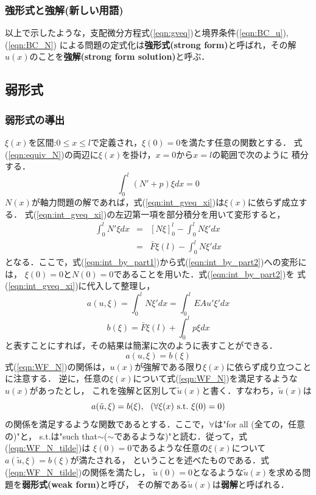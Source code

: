 \documentclass[10pt,a4j]{jarticle}
\begin{document}
\subsubsection{強形式と強解(新しい用語)}
以上で示したような，支配微分方程式(\ref{eqn:gveq})と境界条件(\ref{eqn:BC_u}),(\ref{eqn:BC_N})
による問題の定式化は{\bf 強形式(strong form)}と呼ばれ，その解$u(x)$のことを{\bf 強解(strong form solution)}と呼ぶ．
\subsection{弱形式}
\subsubsection{弱形式の導出}
$\xi (x)$を区間:$0\leq x \leq l$で定義され，$\xi(0)=0$を満たす任意の関数とする．
式(\ref{eqn:equiv_N})の両辺に$\xi (x)$を掛け，$x=0$から$x=l$の範囲で次のように
積分する．
\begin{equation}
	\int _0^l 
	\left(N'+p \right) \xi dx =0
	\label{eqn:int_gveq_xi}
\end{equation}
$N(x)$が軸力問題の解であれば，式(\ref{eqn:int_gveq_xi})は$\xi(x)$に依らず成立する．
式(\ref{eqn:int_gveq_xi})の左辺第一項を部分積分を用いて変形すると，
\begin{eqnarray}
	\int _0^l N'\xi dx &= & \left[ N\xi \right]_0^l -\int_0^l N \xi'dx  
	\label{eqn:int_by_part1}
	\\
	&= & \bar F \xi(l)  -\int_0^l N \xi'dx  
	\label{eqn:int_by_part2}
\end{eqnarray}
となる．ここで，式(\ref{eqn:int_by_part1})から式(\ref{eqn:int_by_part2})への変形には，
$\xi(0)=0$と$N(0)=0$であることを用いた．式(\ref{eqn:int_by_part2})を
式(\ref{eqn:int_gveq_xi})に代入して整理し，
\begin{equation}
	a(u,\xi) = \int_0^l N \xi'dx  
	= \int_0^l EA u' \xi'dx  
	\label{eqn:blinf_N}
\end{equation}
\begin{equation}
	b(\xi)= \bar F \xi (l) + 
	\int_0^l p\xi dx 
	\label{eqn:linf_N}
\end{equation}
と表すことにすれば，その結果は簡潔に次のように表すことができる．
\begin{equation}
	a(u,\xi)=b(\xi)
	\label{eqn:WF_N}
\end{equation}
式(\ref{eqn:WF_N})の関係は，$u(x)$が強解である限り$\xi(x)$に依らず成り立つことに注意する．
逆に，任意の$\xi(x)$について式(\ref{eqn:WF_N})を満足するような$u(x)$があったとし，
これを強解と区別して$\tilde u(x)$と書く．すなわち，$\tilde u(x)$は
\begin{equation}
	a(\tilde u,\xi)=b(\xi), \ \ (\forall \xi(x) \ {\rm s.t.} \ \xi(0)=0)
	\label{eqn:WF_N_tilde}
\end{equation}
の関係を満足するような関数であるとする．ここで，$\forall$は"for all (全ての，任意の)"と，
s.t.は"such that$\sim$($\sim$であるような)"と読む．従って，式(\ref{eqn:WF_N_tilde})は
$\xi(0)=0$であるような任意の$\xi(x)$について$a(\tilde u, \xi)=b(\xi)$が満たされる，
ということを述べたものである．式(\ref{eqn:WF_N_tilde})の関係を満たし，
$\tilde u(0)=0$となるような$\tilde u(x)$を求める問題を{\bf 弱形式(weak form)}と呼び，
その解である$\tilde u(x)$は{\bf 弱解}と呼ばれる．
\end{document}
